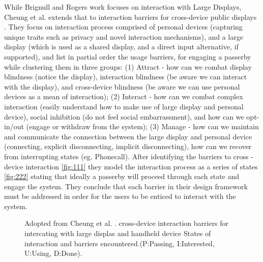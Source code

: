 While Brignull and Rogers work focuses on interaction with Large Displays, Cheung et al.  extends that to interaction barriers for cross-device public displays \cite{Cheung:2014}. They focus on interaction process comprised of personal devices (capturing unique traits such as privacy and novel interaction mechanisms), and a large display (which is used as a shared display, and a direct input alternative, if supported), and list in partial order the usage barriers, for engaging a passerby while clustering them in three groups: (1) Attract - how can we combat display blindness (notice the display), interaction blindness (be aware we can interact with the display), and cross-device blindness (be aware we can use personal devices as a mean of interaction); (2) Interact - how can we combat complex interaction (easily understand how to make use of large display and personal device), social inhibition (do not feel social embarrassment),  and how can we opt-in/out (engage or withdraw from the system); (3) Manage - how can we maintain and communicate the connection between the large display and personal device (connecting, explicit disconnecting, implicit disconnecting), how can we recover from interrupting states (eg. Phonecall). After identifying the barriers to cross - device interaction \ref{fig:111} they model the interaction process as a series of states \ref{fig:222} stating that ideally a passerby will proceed through each state and engage the system. They conclude that each barrier in their design framework must be addressed in order for the users to be enticed to interact with the system.


\begin{figure}[H]
	\centering
	\caption{
		Adopted from Cheung et al. \protect\cite{Cheung:2014}.
		\protect{} cross-device interaction barriers for intercating with large displas and handheld device
		\protect{} States  of interaction and barriers encountered.(P:Passing, I:Interested, U:Using, D:Done).
		}
	\label{fig:Cheung et al. ideas}
\end{figure}

